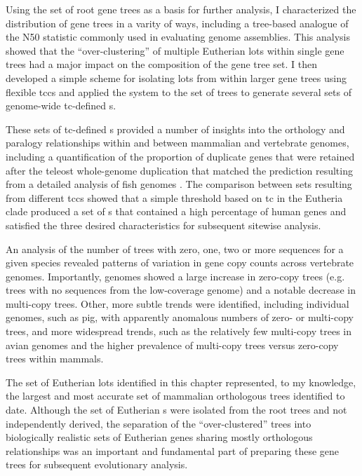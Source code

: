 Using the set of root \cmp gene trees as a basis for further analysis,
I characterized the distribution of gene trees in a varity of ways,
including a tree-based analogue of the N50 statistic commonly used in
evaluating genome assemblies. This analysis showed that the
``over-clustering'' of multiple Eutherian \acp{lot} within single \cmp
gene trees had a major impact on the composition of the gene tree
set. I then developed a simple scheme for isolating \acp{lot} from
within larger gene trees using flexible \acp{tcc} and applied the
system to the set of \cmp trees to generate several sets of
genome-wide \ac{tc}-defined \subtr{}s.

These sets of \ac{tc}-defined \subtr{}s provided a number of insights
into the orthology and paralogy relationships within and between
mammalian and vertebrate genomes, including a quantification of the
proportion of duplicate genes that were retained after the teleost
whole-genome duplication that matched the prediction resulting from a
detailed analysis of fish genomes \citep{Brunet2006}. The comparison
between \subtr{} sets resulting from different \acp{tcc} showed that a
simple threshold based on \ac{tc} in the Eutheria clade produced a set
of \subtr{}s that contained a high percentage of human genes and
satisfied the three desired characteristics for subsequent sitewise
analysis.

An analysis of the number of trees with zero, one, two or more
sequences for a given species revealed patterns of variation in gene
copy counts across vertebrate genomes. Importantly, \lcv genomes
showed a large increase in zero-copy trees (e.g. trees with no
sequences from the low-coverage genome) and a notable decrease in
multi-copy trees. Other, more subtle trends were identified, including
individual genomes, such as pig, with apparently anomalous numbers of
zero- or multi-copy trees, and more widespread trends, such as the
relatively few multi-copy trees in avian genomes and the higher
prevalence of multi-copy trees versus zero-copy trees within mammals.

The set of Eutherian \acp{lot} identified in this chapter represented,
to my knowledge, the largest and most accurate set of mammalian
orthologous trees identified to date. Although the set of Eutherian
\subtr{}s were isolated from the \cmp root trees and not independently
derived, the separation of the ``over-clustered'' \cmp trees into
biologically realistic sets of Eutherian genes sharing mostly
orthologous relationships was an important and fundamental part of
preparing these gene trees for subsequent evolutionary
analysis.

